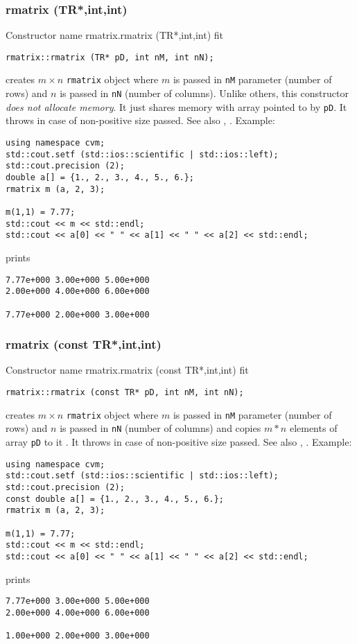 \subsubsection{rmatrix (TR*,int,int)}
Constructor%
\pdfdest name {rmatrix.rmatrix (TR*,int,int)} fit
\begin{verbatim}
rmatrix::rmatrix (TR* pD, int nM, int nN);
\end{verbatim}
creates  $m\times n$ \verb"rmatrix" object where $m$ is passed in
\verb"nM" parameter (number of rows) and $n$ is passed in
\verb"nN" (number of columns).
Unlike others, this constructor \textit{does not allocate  memory}.
It just shares  memory with  array pointed to by \verb"pD".
It throws  
in case of non-positive size passed.
See also , .
Example:
\begin{Verbatim}
using namespace cvm;
std::cout.setf (std::ios::scientific | std::ios::left);
std::cout.precision (2);
double a[] = {1., 2., 3., 4., 5., 6.};
rmatrix m (a, 2, 3);

m(1,1) = 7.77;
std::cout << m << std::endl;
std::cout << a[0] << " " << a[1] << " " << a[2] << std::endl;
\end{Verbatim}
prints
\begin{Verbatim}
7.77e+000 3.00e+000 5.00e+000
2.00e+000 4.00e+000 6.00e+000

7.77e+000 2.00e+000 3.00e+000
\end{Verbatim}
\newpage


\subsubsection{rmatrix (const TR*,int,int)}
Constructor%
\pdfdest name {rmatrix.rmatrix (const TR*,int,int)} fit
\begin{verbatim}
rmatrix::rmatrix (const TR* pD, int nM, int nN);
\end{verbatim}
creates  $m\times n$ \verb"rmatrix" object where $m$ is passed in
\verb"nM" parameter (number of rows) and $n$ is passed in
\verb"nN" (number of columns)
and copies $m*n$ elements of  array \verb"pD" to it .
It throws  
in case of non-positive size passed.
See also , .
Example:
\begin{Verbatim}
using namespace cvm;
std::cout.setf (std::ios::scientific | std::ios::left);
std::cout.precision (2);
const double a[] = {1., 2., 3., 4., 5., 6.};
rmatrix m (a, 2, 3);

m(1,1) = 7.77;
std::cout << m << std::endl;
std::cout << a[0] << " " << a[1] << " " << a[2] << std::endl;
\end{Verbatim}
prints
\begin{Verbatim}
7.77e+000 3.00e+000 5.00e+000
2.00e+000 4.00e+000 6.00e+000

1.00e+000 2.00e+000 3.00e+000
\end{Verbatim}
\newpage



